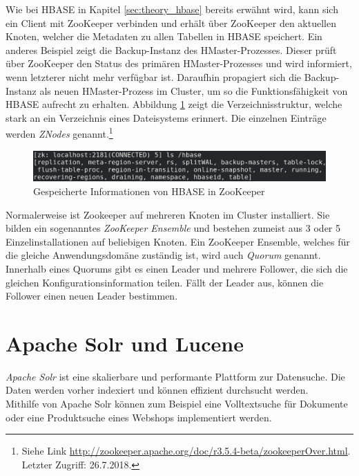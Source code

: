 \noindent
Wie bei HBASE in Kapitel \ref{sec:theory_hbase} bereits erwähnt wird, kann sich ein Client mit ZooKeeper verbinden und erhält über ZooKeeper den aktuellen Knoten, welcher die Metadaten zu allen Tabellen in HBASE speichert. Ein anderes Beispiel zeigt die Backup-Instanz des HMaster-Prozesses.
Dieser prüft über ZooKeeper den Status des primären HMaster-Prozesses und wird informiert, wenn letzterer nicht mehr verfügbar ist. Daraufhin propagiert sich die Backup-Instanz als neuen HMaster-Prozess im Cluster, um so die Funktionsfähigkeit von HBASE aufrecht zu erhalten. Abbildung \ref{fig:zookeeper_dir} zeigt die Verzeichnisstruktur, welche stark an ein Verzeichnis eines Dateisystems erinnert. Die einzelnen Einträge werden \textit{ZNodes} genannt.\footnote{Siehe Link \url{http://zookeeper.apache.org/doc/r3.5.4-beta/zookeeperOver.html}. Letzter Zugriff: 26.7.2018.} \\

\begin{figure}[ht]
  \centering
  \includegraphics[width=\textwidth]{./resource/zookeeper_dir.png}
  \caption{Gespeicherte Informationen von HBASE in ZooKeeper}
  \label{fig:zookeeper_dir}
\end{figure}


\noindent
Normalerweise ist Zookeeper auf mehreren Knoten im Cluster installiert. Sie bilden ein sogenanntes \textit{ZooKeeper Ensemble} und bestehen zumeist aus 3 oder 5 Einzelinstallationen auf beliebigen Knoten. Ein ZooKeeper Ensemble, welches für die gleiche Anwendungsdomäne zuständig ist, wird auch \textit{Quorum} genannt. Innerhalb eines Quorums gibt es einen Leader und mehrere Follower, die sich die gleichen Konfigurationsinformation teilen. Fällt der Leader aus, können die Follower einen neuen Leader bestimmen.\cite{zookeeper_essentials}\\

\section{Apache Solr und Lucene}
\label{sec:theory_solr}
\textit{Apache Solr\texttrademark\thinspace} ist eine skalierbare und performante Plattform zur Datensuche. Die Daten werden vorher indexiert und können effizient durchsucht werden.\cite{solr_search}\\
Mithilfe von Apache Solr können zum Beispiel eine Volltextsuche für Dokumente oder eine Produktsuche eines Webshops implementiert werden.

